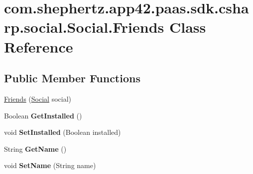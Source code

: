 \hypertarget{classcom_1_1shephertz_1_1app42_1_1paas_1_1sdk_1_1csharp_1_1social_1_1_social_1_1_friends}{\section{com.\+shephertz.\+app42.\+paas.\+sdk.\+csharp.\+social.\+Social.\+Friends Class Reference}
\label{classcom_1_1shephertz_1_1app42_1_1paas_1_1sdk_1_1csharp_1_1social_1_1_social_1_1_friends}
}
\subsection*{Public Member Functions}
\begin{DoxyCompactItemize}
\item 
\hyperlink{classcom_1_1shephertz_1_1app42_1_1paas_1_1sdk_1_1csharp_1_1social_1_1_social_1_1_friends_a1041656a8b023305b3854da3c3b17edb}{Friends} (\hyperlink{classcom_1_1shephertz_1_1app42_1_1paas_1_1sdk_1_1csharp_1_1social_1_1_social}{Social} social)
\item 
\hypertarget{classcom_1_1shephertz_1_1app42_1_1paas_1_1sdk_1_1csharp_1_1social_1_1_social_1_1_friends_ae80f0495a6d29c4d3de063da9a866ef0}{Boolean {\bfseries Get\+Installed} ()}\label{classcom_1_1shephertz_1_1app42_1_1paas_1_1sdk_1_1csharp_1_1social_1_1_social_1_1_friends_ae80f0495a6d29c4d3de063da9a866ef0}

\item 
\hypertarget{classcom_1_1shephertz_1_1app42_1_1paas_1_1sdk_1_1csharp_1_1social_1_1_social_1_1_friends_afa5cd36e3025a8c2edd0423d0633b828}{void {\bfseries Set\+Installed} (Boolean installed)}\label{classcom_1_1shephertz_1_1app42_1_1paas_1_1sdk_1_1csharp_1_1social_1_1_social_1_1_friends_afa5cd36e3025a8c2edd0423d0633b828}

\item 
\hypertarget{classcom_1_1shephertz_1_1app42_1_1paas_1_1sdk_1_1csharp_1_1social_1_1_social_1_1_friends_a5a079548c6d6bc4684430a9fd06b01e6}{String {\bfseries Get\+Name} ()}\label{classcom_1_1shephertz_1_1app42_1_1paas_1_1sdk_1_1csharp_1_1social_1_1_social_1_1_friends_a5a079548c6d6bc4684430a9fd06b01e6}

\item 
\hypertarget{classcom_1_1shephertz_1_1app42_1_1paas_1_1sdk_1_1csharp_1_1social_1_1_social_1_1_friends_a0c675a650e2dd139207751a69c13f2ad}{void {\bfseries Set\+Name} (String name)}\label{classcom_1_1shephertz_1_1app42_1_1paas_1_1sdk_1_1csharp_1_1social_1_1_social_1_1_friends_a0c675a650e2dd139207751a69c13f2ad}


\end{DoxyCompactItemize}
